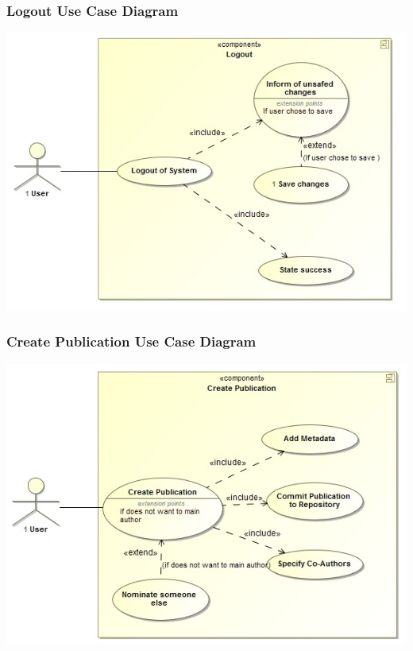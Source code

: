 \documentclass[a4paper,12pt]{article}
\begin{document}
	\subsubsection{Logout Use Case Diagram}
	\includegraphics[width=1\textwidth]{./Logout.jpg}\\[1.5cm]
	
	\subsubsection{Create Publication Use Case Diagram}
	\includegraphics[width=1\textwidth]{./CreatePublication.jpg}\\[1.5cm]
\end{document}
